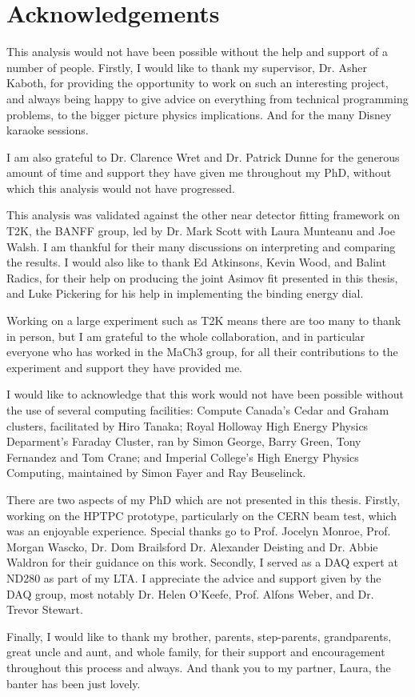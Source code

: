 \chapter*{Acknowledgements}

This analysis would not have been possible without the help and support of a number of people. Firstly, I would like to thank my supervisor, Dr. Asher Kaboth, for providing the opportunity to work on such an interesting project, and always being happy to give advice on everything from technical programming problems, to the bigger picture physics implications. And for the many Disney karaoke sessions.

I am also grateful to Dr. Clarence Wret and Dr. Patrick Dunne for the generous amount of time and support they have given me throughout my PhD, without which this analysis would not have progressed.

This analysis was validated against the other near detector fitting framework on T2K, the BANFF group, led by Dr. Mark Scott with Laura Munteanu and Joe Walsh. I am thankful for their many discussions on interpreting and comparing the results. I would also like to thank Ed Atkinsons, Kevin Wood, and Balint Radics, for their help on producing the joint Asimov fit presented in this thesis, and Luke Pickering for his help in implementing the binding energy dial.

Working on a large experiment such as T2K means there are too many to thank in person, but I am grateful to the whole collaboration, and in particular everyone who has worked in the MaCh3 group, for all their contributions to the experiment and support they have provided me.

I would like to acknowledge that this work would not have been possible without the use of several computing facilities: Compute Canada's Cedar and Graham clusters, facilitated by Hiro Tanaka; Royal Holloway High Energy Physics Deparment's Faraday Cluster, ran by Simon George, Barry Green, Tony Fernandez and Tom Crane; and Imperial College's High Energy Physics Computing, maintained by Simon Fayer and Ray Beuselinck.

There are two aspects of my PhD which are not presented in this thesis. Firstly, working on the HPTPC prototype, particularly on the CERN beam test, which was an enjoyable experience. Special thanks go to Prof. Jocelyn Monroe, Prof. Morgan Wascko, Dr. Dom Brailsford Dr. Alexander Deisting and Dr. Abbie Waldron for their guidance on this work. Secondly, I served as a DAQ expert at ND280 as part of my LTA. I appreciate the advice and support given by the DAQ group, most notably Dr. Helen O'Keefe, Prof. Alfons Weber, and Dr. Trevor Stewart.

Finally, I would like to thank my brother, parents, step-parents, grandparents, great uncle and aunt, and whole family, for their support and encouragement throughout this process and always. And thank you to my partner, Laura, the banter has been just lovely.

\newpage
